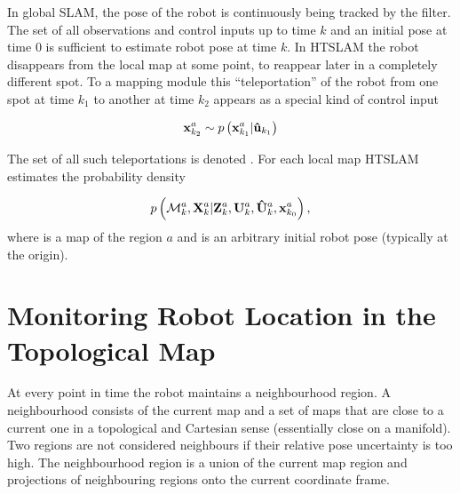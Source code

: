 In global SLAM, the pose of the robot is continuously being tracked by
the filter. The set of all observations and control inputs up to time
$k$ and an initial pose at time 0 is sufficient to estimate robot pose
at time $k$. In HTSLAM the robot disappears from the local map at some
point, to reappear later in a completely different spot. To a mapping
module this ``teleportation'' of the robot from one spot at time $k_1$
to another at time $k_2$ appears as a special kind of control input

$$
\x{k_2}{}{a} \sample{}{} \prob{\x{k_1}{}{a} | \Teleport{k_1}}
$$

The set of all such teleportations is denoted . For
each local map HTSLAM estimates the probability density

$$
\prob{\map{k}{}{a},\Xall{k}{}{a} | 
\Zall{k}{a},\Uall{k}{a},\TeleportAll{k}{a},\x{k_0}{}{a}},
$$
where  is a map of the region $a$ and  is an
arbitrary initial robot pose (typically at the origin).




\section{Monitoring Robot Location in the Topological Map}
\label{sec:topological_pose}

At every point in time the robot maintains a neighbourhood region. A
neighbourhood consists of the current map and a set of maps that are
close to a current one in a topological and Cartesian sense
(essentially close on a manifold). Two regions are not considered
neighbours if their relative pose uncertainty is too high. The
neighbourhood region is a union of the current map region and
projections of neighbouring regions onto the current coordinate frame.

